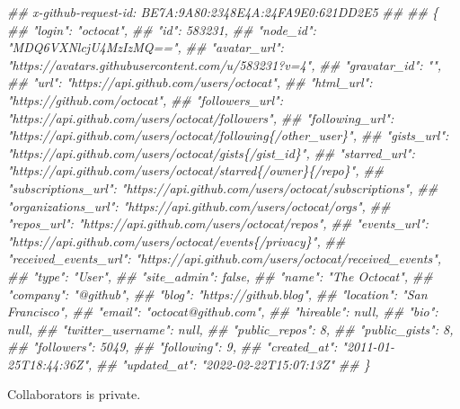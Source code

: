 \documentclass[
  10pt,
]{article}
\newenvironment{Shaded}{\begin{snugshade}}{\end{snugshade}}
\newcommand{\CommentTok}[1]{\textcolor[rgb]{0.56,0.35,0.01}{\textit{#1}}}
\begin{document}
\begin{Shaded}
\begin{Highlighting}[]
      \CommentTok{\#\# x{-}github{-}request{-}id: BE7A:9A80:2348E4A:24FA9E0:621DD2E5}
      \CommentTok{\#\# }
      \CommentTok{\#\# \{}
      \CommentTok{\#\#   "login": "octocat",}
      \CommentTok{\#\#   "id": 583231,}
      \CommentTok{\#\#   "node\_id": "MDQ6VXNlcjU4MzIzMQ==",}
      \CommentTok{\#\#   "avatar\_url": "https://avatars.githubusercontent.com/u/583231?v=4",}
      \CommentTok{\#\#   "gravatar\_id": "",}
      \CommentTok{\#\#   "url": "https://api.github.com/users/octocat",}
      \CommentTok{\#\#   "html\_url": "https://github.com/octocat",}
      \CommentTok{\#\#   "followers\_url": "https://api.github.com/users/octocat/followers",}
      \CommentTok{\#\#   "following\_url": "https://api.github.com/users/octocat/following\{/other\_user\}",}
      \CommentTok{\#\#   "gists\_url": "https://api.github.com/users/octocat/gists\{/gist\_id\}",}
      \CommentTok{\#\#   "starred\_url": "https://api.github.com/users/octocat/starred\{/owner\}\{/repo\}",}
      \CommentTok{\#\#   "subscriptions\_url": "https://api.github.com/users/octocat/subscriptions",}
      \CommentTok{\#\#   "organizations\_url": "https://api.github.com/users/octocat/orgs",}
      \CommentTok{\#\#   "repos\_url": "https://api.github.com/users/octocat/repos",}
      \CommentTok{\#\#   "events\_url": "https://api.github.com/users/octocat/events\{/privacy\}",}
      \CommentTok{\#\#   "received\_events\_url": "https://api.github.com/users/octocat/received\_events",}
      \CommentTok{\#\#   "type": "User",}
      \CommentTok{\#\#   "site\_admin": false,}
      \CommentTok{\#\#   "name": "The Octocat",}
      \CommentTok{\#\#   "company": "@github",}
      \CommentTok{\#\#   "blog": "https://github.blog",}
      \CommentTok{\#\#   "location": "San Francisco",}
      \CommentTok{\#\#   "email": "octocat@github.com",}
      \CommentTok{\#\#   "hireable": null,}
      \CommentTok{\#\#   "bio": null,}
      \CommentTok{\#\#   "twitter\_username": null,}
      \CommentTok{\#\#   "public\_repos": 8,}
      \CommentTok{\#\#   "public\_gists": 8,}
      \CommentTok{\#\#   "followers": 5049,}
      \CommentTok{\#\#   "following": 9,}
      \CommentTok{\#\#   "created\_at": "2011{-}01{-}25T18:44:36Z",}
      \CommentTok{\#\#   "updated\_at": "2022{-}02{-}22T15:07:13Z"}
      \CommentTok{\#\# \}}
\end{Highlighting}
\end{Shaded}

Collaborators is private.
\end{document}
